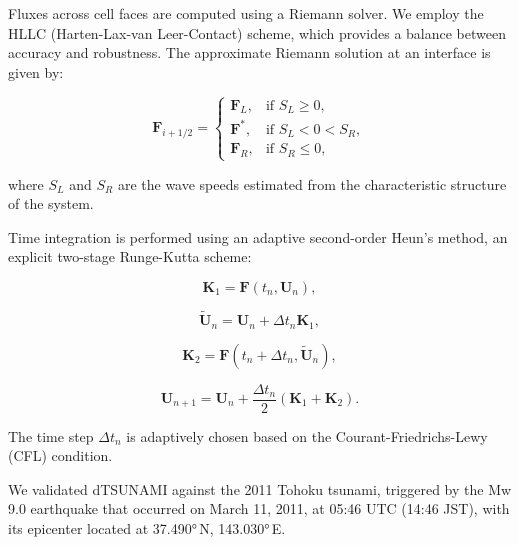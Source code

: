 Fluxes across cell faces are computed using a Riemann solver. We employ the HLLC (Harten-Lax-van Leer-Contact) scheme, which provides a balance between accuracy and robustness. The approximate Riemann solution at an interface is given by:

\begin{equation}
\mathbf{F}_{i+1/2} = 
\begin{cases}
\mathbf{F}_L, & \text{if } S_L \geq 0, \\[5pt]
\mathbf{F}^*, & \text{if } S_L < 0 < S_R, \\[5pt]
\mathbf{F}_R, & \text{if } S_R \leq 0,
\end{cases}
\end{equation}

where \( S_L \) and \( S_R \) are the wave speeds estimated from the characteristic structure of the system.

Time integration is performed using an adaptive second-order Heun’s method, an explicit two-stage Runge-Kutta scheme:

\begin{equation}
\mathbf{K}_1 = \mathbf{F}(t_n, \mathbf{U}_n),
\end{equation}

\begin{equation}
\widetilde{\mathbf{U}}_n = \mathbf{U}_n + \Delta t_n \mathbf{K}_1,
\end{equation}

\begin{equation}
\mathbf{K}_2 = \mathbf{F}(t_n + \Delta t_n, \widetilde{\mathbf{U}}_n),
\end{equation}

\begin{equation}
\mathbf{U}_{n+1} = \mathbf{U}_n + \frac{\Delta t_n}{2} (\mathbf{K}_1 + \mathbf{K}_2).
\end{equation}

The time step \( \Delta t_n \) is adaptively chosen based on the Courant-Friedrichs-Lewy (CFL) condition.






We validated dTSUNAMI against the 2011 Tohoku tsunami, triggered by the Mw 9.0 earthquake that occurred on March 11, 2011, at 05:46 UTC (14:46 JST), with its epicenter located at 37.490°\,N, 143.030°\,E. 

